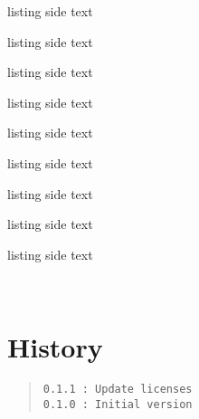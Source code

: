 \documentclass[11pt,a4paper]{ltxdoc}
\begin{document}
\begin{tcblisting}{listing side text}
\samplevectorlogo{\logogeogebra[icon]}
\end{tcblisting}

\begin{tcblisting}{listing side text}
\samplevectorlogo{\logoscratch}
\end{tcblisting}

\begin{tcblisting}{listing side text}
\samplevectorlogo{\logoscratch[alt]}
\end{tcblisting}

\begin{tcblisting}{listing side text}
\samplevectorlogo{\logoscratch[cat]}
\end{tcblisting}

\begin{tcblisting}{listing side text}
\samplevectorlogo{\logotexstudio}
\end{tcblisting}

\begin{tcblisting}{listing side text}
\samplevectorlogo{\logoemacs}
\end{tcblisting}

\begin{tcblisting}{listing side text}
\samplevectorlogo{\logoemacs[alt]}
\end{tcblisting}

\begin{tcblisting}{listing side text}
\samplevectorlogo{\logotexmaker}
\end{tcblisting}

\begin{tcblisting}{listing side text}
\samplevectorlogo{\logotexmaker[alt]}
\end{tcblisting}


\vfill~

\section{History}

\begin{quote}
\begin{verbatim}
0.1.1 : Update licenses
0.1.0 : Initial version
\end{verbatim}
\end{quote}
\end{document}
